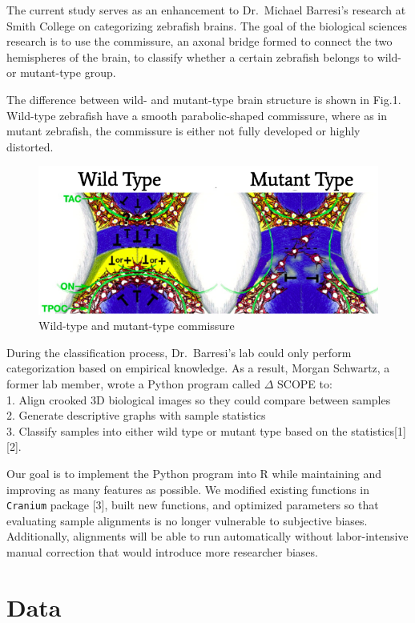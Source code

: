 \documentclass[10pt,letterpaper]{article}
\begin{document}
The current study serves as an enhancement to Dr.~Michael Barresi's
research at Smith College on categorizing zebrafish brains. The goal of
the biological sciences research is to use the commissure, an axonal
bridge formed to connect the two hemispheres of the brain, to classify
whether a certain zebrafish belongs to wild- or mutant-type group.

The difference between wild- and mutant-type brain structure is shown in
Fig.1. Wild-type zebrafish have a smooth parabolic-shaped commissure,
where as in mutant zebrafish, the commissure is either not fully
developed or highly distorted.

\begin{figure}[H]
\includegraphics[width=0.9\linewidth]{visualization_paper/wt_yt} \caption{Wild-type and mutant-type commissure}\label{fig:Figure1}
\end{figure}

During the classification process, Dr.~Barresi's lab could only perform
categorization based on empirical knowledge. As a result, Morgan
Schwartz, a former lab member, wrote a Python program called \(\Delta\)
SCOPE to:\\
1. Align crooked 3D biological images so they could compare between
samples\\
2. Generate descriptive graphs with sample statistics\\
3. Classify samples into either wild type or mutant type based on the
statistics{[}1{]} {[}2{]}.

Our goal is to implement the Python program into R while maintaining and
improving as many features as possible. We modified existing functions
in \texttt{Cranium} package {[}3{]}, built new functions, and optimized
parameters so that evaluating sample alignments is no longer vulnerable
to subjective biases. Additionally, alignments will be able to run
automatically without labor-intensive manual correction that would
introduce more researcher biases.

\hypertarget{data}{%
\section{Data}\label{data}}
\end{document}
